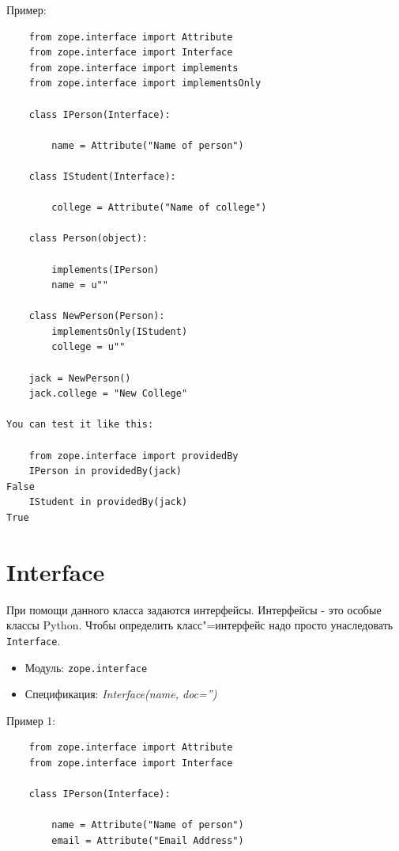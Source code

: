 \documentclass[a4paper,openany,twoside,draft]{book}
\providecommand*{\DUroletitlereference}[1]{\textsl{#1}}
\begin{document}
Пример:

\begin{verbatim}
    from zope.interface import Attribute
    from zope.interface import Interface
    from zope.interface import implements
    from zope.interface import implementsOnly

    class IPerson(Interface):

        name = Attribute("Name of person")

    class IStudent(Interface):

        college = Attribute("Name of college")

    class Person(object):

        implements(IPerson)
        name = u""

    class NewPerson(Person):
        implementsOnly(IStudent)
        college = u""

    jack = NewPerson()
    jack.college = "New College"

You can test it like this:

    from zope.interface import providedBy
    IPerson in providedBy(jack)
False
    IStudent in providedBy(jack)
True
\end{verbatim}


\section*{Interface%
  \label{interface}%
}

При помощи данного класса задаются интерфейсы. Интерфейсы - это особые классы Python.  Чтобы определить класс"=интерфейс надо просто унаследовать \texttt{Interface}.

\begin{itemize}

\item Модуль: \texttt{zope.interface}

\item Спецификация: \DUroletitlereference{Interface(name, doc='')}

\end{itemize}

Пример 1:

\begin{verbatim}
    from zope.interface import Attribute
    from zope.interface import Interface

    class IPerson(Interface):

        name = Attribute("Name of person")
        email = Attribute("Email Address")
\end{verbatim}
\end{document}
